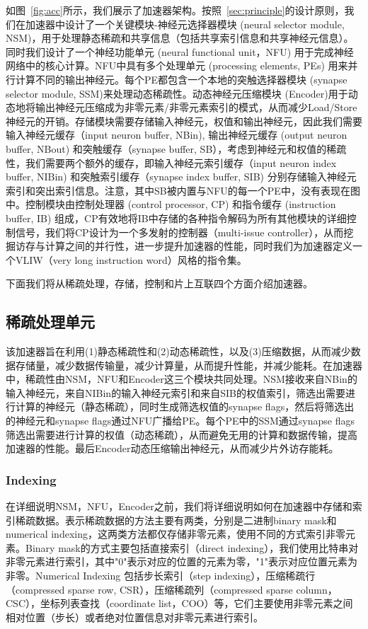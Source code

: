如图~\ref{fig:acc}所示，我们展示了加速器架构。按照~\ref{sec:principle}的设计原则，我们在加速器中设计了一个关键模块-神经元选择器模块 (neural selector module, NSM)，用于处理静态稀疏和共享信息（包括共享索引信息和共享神经元信息）。同时我们设计了一个神经功能单元 (neural functional unit，NFU) 用于完成神经网络中的核心计算。NFU中具有多个处理单元 (processing elements, PEs) 用来并行计算不同的输出神经元。每个PE都包含一个本地的突触选择器模块 (synapse selector module, SSM)来处理动态稀疏性。动态神经元压缩模块 (Encoder)用于动态地将输出神经元压缩成为非零元素/非零元素索引的模式，从而减少Load/Store神经元的开销。存储模块需要存储输入神经元，权值和输出神经元，因此我们需要输入神经元缓存（input neuron buffer, NBin), 输出神经元缓存 (output neuron buffer, NBout) 和突触缓存（synapse buffer, SB），考虑到神经元和权值的稀疏性，我们需要两个额外的缓存，即输入神经元索引缓存（input neuron index buffer, NIBin) 和突触索引缓存（synapse index buffer, SIB) 分别存储输入神经元索引和突出索引信息。注意，其中SB被内置与NFU的每一个PE中，没有表现在图中。控制模块由控制处理器 (control processor, CP) 和指令缓存 (instruction buffer, IB) 组成，CP有效地将IB中存储的各种指令解码为所有其他模块的详细控制信号，我们将CP设计为一个多发射的控制器（multi-issue controller），从而挖掘访存与计算之间的并行性，进一步提升加速器的性能，同时我们为加速器定义一个VLIW（very long instruction word）风格的指令集。

下面我们将从稀疏处理，存储，控制和片上互联四个方面介绍加速器。

\subsection{稀疏处理单元}
该加速器旨在利用(1)静态稀疏性和(2)动态稀疏性，以及(3)压缩数据，从而减少数据存储量，减少数据传输量，减少计算量，从而提升性能，并减少能耗。在加速器中，稀疏性由NSM，NFU和Encoder这三个模块共同处理。NSM接收来自NBin的输入神经元，来自NIBin的输入神经元索引和来自SIB的权值索引，筛选出需要进行计算的神经元（静态稀疏），同时生成筛选权值的synapse flags，然后将筛选出的神经元和synapse flags通过NFU广播给PE。每个PE中的SSM通过synapse flags筛选出需要进行计算的权值（动态稀疏），从而避免无用的计算和数据传输，提高加速器的性能。最后Encoder动态压缩输出神经元，从而减少片外访存能耗。

\subsubsection{Indexing}
在详细说明NSM，NFU，Encoder之前，我们将详细说明如何在加速器中存储和索引稀疏数据。表示稀疏数据的方法主要有两类，分别是二进制binary mask和numerical indexing，这两类方法都仅存储非零元素，使用不同的方式索引非零元素。Binary mask的方式主要包括直接索引（direct indexing），我们使用比特串对非零元素进行索引，其中"0"表示对应的位置的元素为零，"1"表示对应位置元素为非零。Numerical Indexing 包括步长索引（step indexing），压缩稀疏行（compressed sparse row, CSR），压缩稀疏列（compressed sparse column，CSC），坐标列表查找（coordinate list，COO）等，它们主要使用非零元素之间相对位置（步长）或者绝对位置信息对非零元素进行索引。

